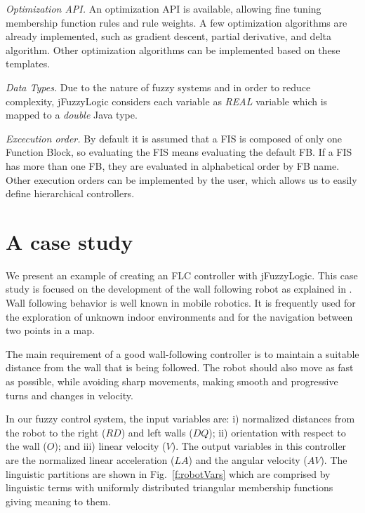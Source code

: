 \documentclass[conference]{IEEEtran}
\begin{document}
\textit{Optimization API.} An optimization API is available, allowing fine tuning membership function rules and rule weights.
A few optimization algorithms are already implemented, such as gradient descent, partial derivative, and delta algorithm.
Other optimization algorithms can be implemented based on these templates.


\textit{Data Types.} Due to the nature of fuzzy systems and in order to reduce complexity, jFuzzyLogic considers each variable as \textit{REAL} variable which is mapped to a \textit{double} Java type.

\textit{Excecution order.} By default it is assumed that a FIS is composed of only one Function Block, so evaluating the FIS means evaluating the default FB. 
If a FIS has more than one FB, they are evaluated in alphabetical order by FB name. 
Other execution orders can be implemented by the user, which allows us to easily define hierarchical controllers.

\section{A case study}
\label{sec:cas}

We present an example of creating an FLC controller with jFuzzyLogic.
This case study is focused on the development of the wall following robot as explained in \cite{mucientes2009learning}.
Wall following behavior is well known in mobile robotics. 
It is frequently used for the exploration of unknown indoor environments and for the navigation between two points in a map. 

The main requirement of a good wall-following controller is to maintain a suitable distance from the wall that is being followed. 
The robot should also move as fast as possible, while avoiding sharp movements, making smooth and progressive turns and changes in velocity.

In our fuzzy control system, the input variables are: 
	i) normalized distances from the robot to the right ($RD$) and left walls ($DQ$); 
	ii) orientation with respect to the wall ($O$); and 
	iii) linear velocity ($V$). 
The output variables in this controller are the normalized linear acceleration ($LA$) and the angular velocity ($AV$). 
The linguistic partitions are shown in Fig.~\ref{f:robotVars} which are comprised by linguistic terms with uniformly distributed triangular membership functions giving meaning to them.
\end{document}
